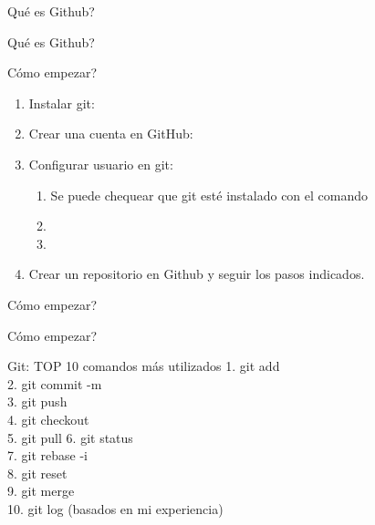 \documentclass[aspectratio=43,10pt,t]{beamer}
\begin{document}
\begin{frame}{Qué es Github?}
\end{frame}

\begin{frame}{Qué es Github?}
\end{frame}

\begin{frame}{Cómo empezar?}
  \begin{enumerate}
    \item Instalar git: 
    \item Crear una cuenta en GitHub: 
    \item Configurar usuario en git:
    \begin{enumerate}
      \item Se puede chequear que git esté instalado con el comando 
      \item {}
      \item {}
    \end{enumerate}
    \item Crear un repositorio en Github y seguir los pasos indicados.
  \end{enumerate}
\end{frame}

\begin{frame}{Cómo empezar?}
\end{frame}

\begin{frame}{Cómo empezar?}
\end{frame}

\begin{frame}{Git: TOP 10 comandos más utilizados}
    {1. git add\\2. git commit -m\\3. git push\\4. git checkout\\5. git pull}
    {6. git status\\7. git rebase -i\\8. git reset\\9. git merge\\10. git log}
    {(basados en mi experiencia)}
\end{frame}
\end{document}
